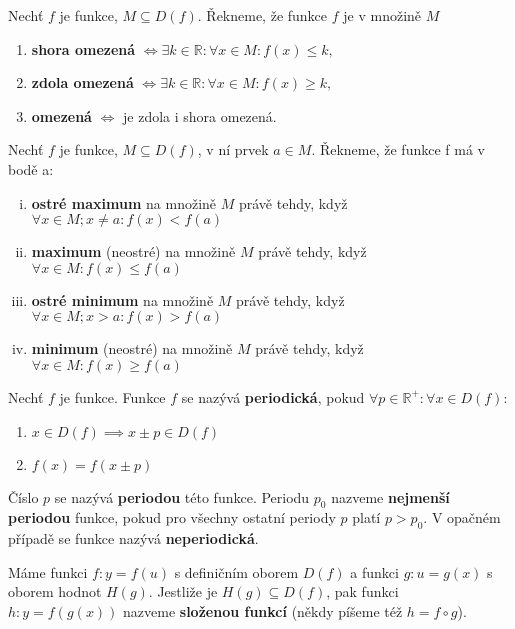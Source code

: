 \begin{definition}
  Nechť $f$ je funkce, $M\subseteq D(f)$. Řekneme, že funkce $f$ je v množině $M$
  \begin{enumerate}[$i.$]
    \item \textbf{shora omezená} $\iff \exists k \in \mathbb R: \forall x \in M: f(x)\leq k,$
    \item \textbf{zdola omezená} $\iff \exists k \in \mathbb R: \forall x \in M: f(x)\geq k,$
    \item \textbf{omezená} $\iff $ je zdola i shora omezená.
  \end{enumerate}
\end{definition}


\begin{definition}
  Nechť $f$ je funkce, $M \subseteq D(f)$, v ní prvek $a \in M$.
  Řekneme, že funkce f má v bodě a:
  \begin{enumerate}[i.]
    \item \textbf{ostré maximum} na množině $M$ právě tehdy, když $\forall x \in M; x \not = a: f(x) < f(a)$
    \item \textbf{maximum} (neostré) na množině $M$ právě tehdy, když $\forall x \in M : f(x) \leq f(a)$
    \item \textbf{ostré minimum} na množině $M$ právě tehdy, když $\forall x \in M; x > a: f(x) > f(a)$
    \item \textbf{minimum} (neostré) na množině $M$ právě tehdy, když $\forall x \in M : f(x) \geq f(a)$
  \end{enumerate}
\end{definition}

\begin{definition}
  Nechť $f$ je funkce. Funkce $f$ se nazývá \textbf{periodická}, pokud $\forall p \in \mathbb R^{+}: \forall x \in D(f):$
  \begin{enumerate}
    \item $x \in D(f) \implies x \pm p \in D(f)$
    \item $f(x) = f(x \pm p)$
  \end{enumerate}
  Číslo $p$ se nazývá \textbf{periodou} této funkce. Periodu $p_0$ nazveme \textbf{nejmenší periodou} funkce, pokud pro všechny ostatní periody $p$ platí $p > p_0$. V opačném případě se funkce nazývá \textbf{neperiodická}.
\end{definition}

\begin{definition}
  Máme funkci $f: y = f(u)$ s definičním oborem $D(f)$ a funkci $g: u=g(x)$ s oborem hodnot $H(g)$. Jestliže je $H(g) \subseteq D(f)$, pak funkci $h: y = f(g(x))$ nazveme \textbf{složenou funkcí} (někdy píšeme též $h=f \circ g$).
\end{definition}

